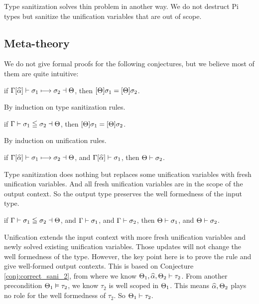 Type sanitization solves thin problem in another way. We do not destruct Pi
types but sanitize the unification variables that are out of scope.

\subsection{Meta-theory}

We do not give formal proofs for the following conjectures, but we believe most of
them are quite intuitive:

\begin{conjecture}
  if $\Gamma[\widehat{\alpha}] \vdash \sigma_1 \longmapsto \sigma_2 \dashv \Theta$,
  then $[\Theta] \sigma_1 = [\Theta] \sigma_2$.
\end{conjecture}
\begin{hproof}
  By induction on type sanitization rules.
\end{hproof}

\begin{conjecture}
  if $\Gamma \vdash \sigma_1 \leqq \sigma_2 \dashv \Theta$,
  then $[\Theta] \sigma_1 = [\Theta] \sigma_2$.
\end{conjecture}
\begin{hproof}
  By induction on unification rules.
\end{hproof}

\begin{conjecture}
  \label{conj:correct_sani_2}
  if $\Gamma[\widehat{\alpha}] \vdash \sigma_1 \longmapsto \sigma_2 \dashv \Theta$,
  and $\Gamma[\widehat{\alpha}] \vdash \sigma_1$,
  then $\Theta \vdash \sigma_2$.
\end{conjecture}
\begin{hproof}
  Type sanitization does nothing but replaces some unification variables with
  fresh unification variables. And all fresh unification variables are in the
  scope of the output context. So the output type preserves the well formedness
  of the input type.
\end{hproof}

\begin{conjecture}
  if $\Gamma \vdash \sigma_1 \leqq \sigma_2 \dashv \Theta$,
  and $\Gamma \vdash \sigma_1$,
  and $\Gamma \vdash \sigma_2$,
  then $\Theta \vdash \sigma_1$,
  and $\Theta \vdash \sigma_2$.
\end{conjecture}
\begin{hproof}
  Unification extends the input context with more fresh unification variables
  and newly solved existing unification variables. Those updates will not change
  the well formedness of the type. However, the key point here is to prove the rule
   and  give well-formed output contexts. This is
  based on Conjecture \ref{conj:correct_sani_2}, from where we know $\Theta_1,
  \widehat{\alpha}, \Theta_2 \vdash \tau_2$. From another precondition $\Theta_1 \vDash
  \tau_2$, we know $\tau_2$ is well scoped in $\Theta_1$. This means $\widehat{\alpha}, \Theta_2$
  plays no role for the well formedness of $\tau_2$. So $\Theta_1 \vdash \tau_2$.
\end{hproof}